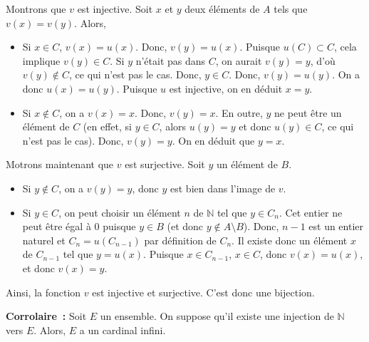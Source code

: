     Montrons que $v$ est injective. 
    Soit $x$ et $y$ deux éléments de $A$ tels que $v(x) = v(y)$. 
    Alors, 
    \begin{itemize}[nosep]
        \item Si $x \in C$, $v(x) = u(x)$. Donc, $v(y) = u(x)$. Puisque $u(C) \subset C$, cela implique $v(y) \in C$. 
            Si $y$ n'était pas dans $C$, on aurait $v(y) = y$, d'où $v(y) \notin C$, ce qui n'est pas le cas. 
            Donc, $y \in C$. 
            Donc, $v(y) = u(y)$. 
            On a donc $u(x) = u(y)$. 
            Puisque $u$ est injective, on en déduit $x = y$.
        \item Si $x \notin C$, on a $v(x) = x$. Donc, $v(y) = x$. 
            En outre, $y$ ne peut être un élément de $C$ (en effet, si $y \in C$, alors $u(y) = y$ et donc $u(y) \in C$, ce qui n'est pas le cas). 
            Donc, $v(y) = y$. 
            On en déduit que $y = x$. 
    \end{itemize}

    Motrons maintenant que $v$ est surjective. 
    Soit $y$ un élément de $B$. 
    \begin{itemize}[nosep]
        \item Si $y \notin C$, on a $v(y) = y$, donc $y$ est bien dans l'image de $v$. 
        \item Si $y \in C$, on peut choisir un élément $n$ de $\mathbb{N}$ tel que $y \in C_n$. 
            Cet entier ne peut être égal à $0$ puisque $y \in B$ (et donc $y \notin A \setminus B$). 
            Donc, $n-1$ est un entier naturel et $C_n = u(C_{n-1})$ par définition de $C_n$. 
            Il existe donc un élément $x$ de $C_{n-1}$ tel que $y = u(x)$. 
            Puisque $x \in C_{n-1}$, $x \in C$, donc $v(x) = u(x)$, et donc $v(x) = y$. 
    \end{itemize}

    Ainsi, la fonction $v$ est injective et surjective. 
    C'est donc une bijection.

   \done 

\medskip

\noindent\textbf{Corrolaire :} Soit $E$ un ensemble. On suppose qu'il existe une injection de $\mathbb{N}$ vers $E$. 
    Alors, $E$ a un cardinal infini.

\medskip

